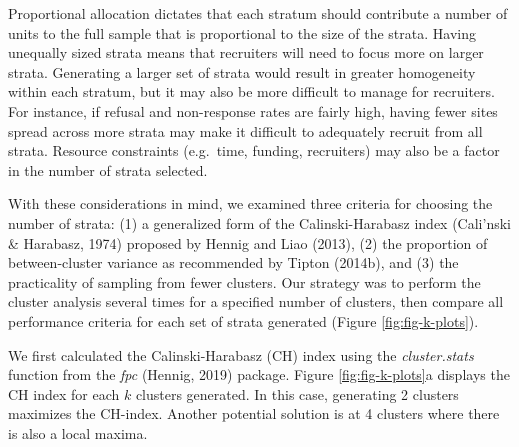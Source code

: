 \documentclass[
  man,floatsintext]{apa6}
\begin{document}
Proportional allocation dictates that each stratum should contribute a number of units to the full sample that is proportional to the size of the strata. Having unequally sized strata means that recruiters will need to focus more on larger strata. Generating a larger set of strata would result in greater homogeneity within each stratum, but it may also be more difficult to manage for recruiters. For instance, if refusal and non-response rates are fairly high, having fewer sites spread across more strata may make it difficult to adequately recruit from all strata. Resource constraints (e.g.~time, funding, recruiters) may also be a factor in the number of strata selected.

With these considerations in mind, we examined three criteria for choosing the number of strata: (1) a generalized form of the Calinski-Harabasz index (Cali'nski \& Harabasz, 1974) proposed by Hennig and Liao (2013), (2) the proportion of between-cluster variance as recommended by Tipton (2014b), and (3) the practicality of sampling from fewer clusters. Our strategy was to perform the cluster analysis several times for a specified number of clusters, then compare all performance criteria for each set of strata generated (Figure \ref{fig:fig-k-plots}).

We first calculated the Calinski-Harabasz (CH) index using the \emph{cluster.stats} function from the \emph{fpc} (Hennig, 2019) package. Figure \ref{fig:fig-k-plots}a displays the CH index for each \(k\) clusters generated. In this case, generating 2 clusters maximizes the CH-index. Another potential solution is at 4 clusters where there is also a local maxima.
\end{document}
